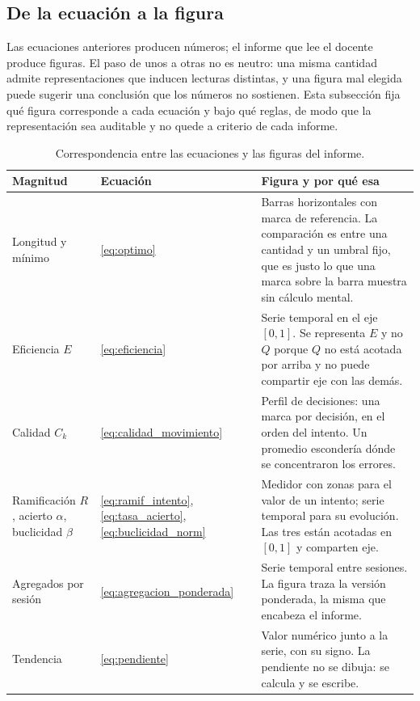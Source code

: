 \documentclass{book}
\begin{document}
\subsection*{De la ecuación a la figura}

Las ecuaciones anteriores producen números; el informe que lee el
docente produce figuras. El paso de unos a otras no es neutro: una
misma cantidad admite representaciones que inducen lecturas
distintas, y una figura mal elegida puede sugerir una conclusión que
los números no sostienen. Esta subsección fija qué figura corresponde
a cada ecuación y bajo qué reglas, de modo que la representación sea
auditable y no quede a criterio de cada informe.

\begin{table}[H]
\centering
\caption{Correspondencia entre las ecuaciones y las figuras del informe.}
\label{tab:ecuacion_figura}
\renewcommand{\arraystretch}{1.25}
\begin{tabular}{|p{3.5cm}|p{2.2cm}|p{8.6cm}|}
\hline
\textbf{Magnitud} & \textbf{Ecuación} & \textbf{Figura y por qué esa} \\
\hline
Longitud y mínimo & \ref{eq:optimo} & Barras horizontales con marca de referencia. La comparación es entre una cantidad y un umbral fijo, que es justo lo que una marca sobre la barra muestra sin cálculo mental. \\
\hline
Eficiencia $E$ & \ref{eq:eficiencia} & Serie temporal en el eje $[0,1]$. Se representa $E$ y no $Q$ porque $Q$ no está acotada por arriba y no puede compartir eje con las demás. \\
\hline
Calidad $C_k$ & \ref{eq:calidad_movimiento} & Perfil de decisiones: una marca por decisión, en el orden del intento. Un promedio escondería dónde se concentraron los errores. \\
\hline
Ramificación $R$, acierto $\alpha$, buclicidad $\beta$ & \ref{eq:ramif_intento}, \ref{eq:tasa_acierto}, \ref{eq:buclicidad_norm} & Medidor con zonas para el valor de un intento; serie temporal para su evolución. Las tres están acotadas en $[0,1]$ y comparten eje. \\
\hline
Agregados por sesión & \ref{eq:agregacion_ponderada} & Serie temporal entre sesiones. La figura traza la versión ponderada, la misma que encabeza el informe. \\
\hline
Tendencia & \ref{eq:pendiente} & Valor numérico junto a la serie, con su signo. La pendiente no se dibuja: se calcula y se escribe. \\

\end{tabular}
\end{table}
\end{document}
